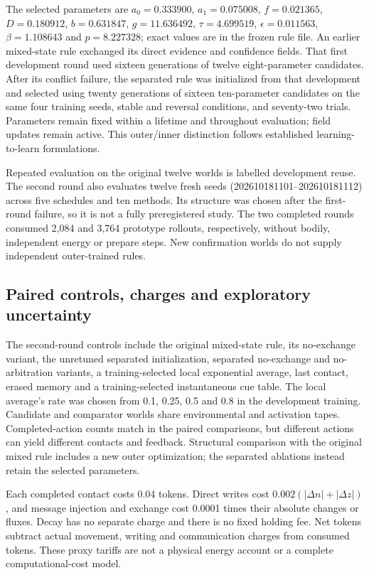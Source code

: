 The selected parameters are $a_0=0.333900$, $a_1=0.075008$, $f=0.021365$, $D=0.180912$, $b=0.631847$, $g=11.636492$, $\tau=4.699519$, $\epsilon=0.011563$, $\beta=1.108643$ and $p=8.227328$; exact values are in the frozen rule file. An earlier mixed-state rule exchanged its direct evidence and confidence fields. That first development round used sixteen generations of twelve eight-parameter candidates. After its conflict failure, the separated rule was initialized from that development and selected using twenty generations of sixteen ten-parameter candidates on the same four training seeds, stable and reversal conditions, and seventy-two trials. Parameters remain fixed within a lifetime and throughout evaluation; field updates remain active. This outer/inner distinction follows established learning-to-learn formulations\cite{duan,wang}.

Repeated evaluation on the original twelve worlds is labelled development reuse. The second round also evaluates twelve fresh seeds (202610181101--202610181112) across five schedules and ten methods. Its structure was chosen after the first-round failure, so it is not a fully preregistered study. The two completed rounds consumed 2,084 and 3,764 prototype rollouts, respectively, without bodily, independent energy or prepare steps. New confirmation worlds do not supply independent outer-trained rules.

\subsection*{Paired controls, charges and exploratory uncertainty}
The second-round controls include the original mixed-state rule, its no-exchange variant, the unretuned separated initialization, separated no-exchange and no-arbitration variants, a training-selected local exponential average, last contact, erased memory and a training-selected instantaneous cue table. The local average's rate was chosen from 0.1, 0.25, 0.5 and 0.8 in the development training. Candidate and comparator worlds share environmental and activation tapes. Completed-action counts match in the paired comparisons, but different actions can yield different contacts and feedback. Structural comparison with the original mixed rule includes a new outer optimization; the separated ablations instead retain the selected parameters.

Each completed contact costs 0.04 tokens. Direct writes cost $0.002(|\Delta n|+|\Delta z|)$, and message injection and exchange cost 0.0001 times their absolute changes or fluxes. Decay has no separate charge and there is no fixed holding fee. Net tokens subtract actual movement, writing and communication charges from consumed tokens. These proxy tariffs are not a physical energy account or a complete computational-cost model.

